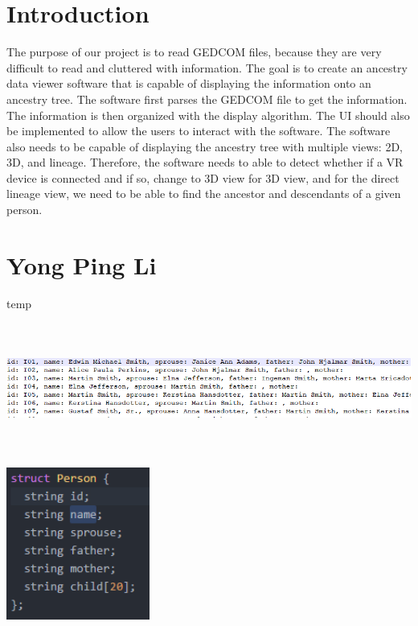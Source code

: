 \documentclass[onecolumn, draftclsnofoot, 10pt, compsoc]{IEEEtran}
\begin{document}
\section{Introduction }
\begin{singlespace}
The purpose of our project is to read GEDCOM files, because they are very difficult to read and cluttered with information. The goal is to create an ancestry data viewer software that is capable of displaying the information onto an ancestry tree. The software first parses the GEDCOM file to get the information. The information is then organized with the display algorithm. The UI should also be implemented to allow the users to interact with the software. The software also needs to be capable of displaying the ancestry tree with multiple views: 2D, 3D, and lineage. Therefore, the software needs to able to detect whether if a VR device is connected and if so, change to 3D view for 3D view, and for the direct lineage view, we need to be able to find the ancestor and descendants of a given person.
\end{singlespace}

\section{Yong Ping Li}
\begin{singlespace}
temp
\newline
\includegraphics[height=5cm]{data}
\includegraphics[height=5cm]{struct}
\newline
\end{singlespace}
\end{document}
